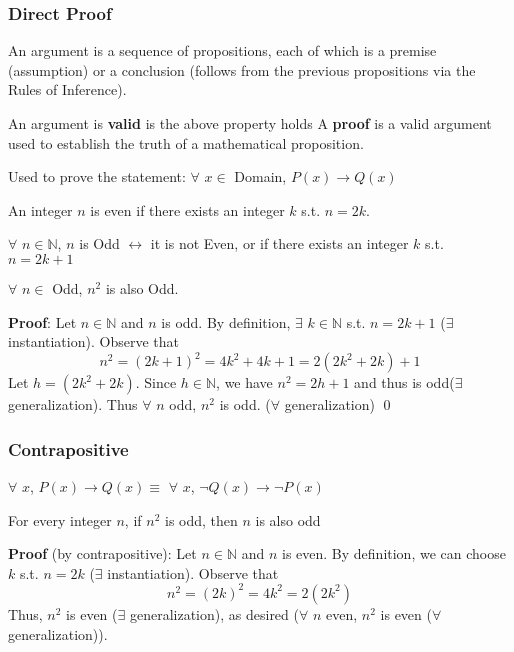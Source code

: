\documentclass[11pt]{scrartcl}
\begin{document}
\subsubsection{Direct Proof}
\begin{definition}[Argument]
    An argument is a sequence of propositions, each of which is a premise (assumption) or a conclusion (follows from the previous propositions via the Rules of Inference). 
\end{definition}
An argument is \textbf{valid} is the above property holds
A \textbf{proof} is a valid argument used to establish the truth of a mathematical proposition.
\begin{definition}
    Used to prove the statement: $\forall$ $x \in$ Domain, $P(x) \rightarrow Q(x)$
\end{definition}
\begin{example}
    \begin{definition}[Even]
        An integer $n$ is even if there exists an integer $k$ s.t. $n=2k$.
    \end{definition}
    \begin{definition}[Odd]
        $\forall$ $n \in \mathbb{N}$, $n$ is Odd $\leftrightarrow$ it is not Even, or if there exists an integer $k$ s.t. $n=2k+1$
    \end{definition}
    \noindent
    \begin{proposition}[A]
    $\forall$ $n \in$ Odd, $n^2$ is also Odd.\\
    \end{proposition}
    \textbf{Proof}: Let $n\in \mathbb{N}$ and $n$ is odd. By definition, $\exists$ $k \in \mathbb{N}$ s.t. $n=2k+1$ ($\exists$ instantiation). Observe that $$n^2 = (2k+1)^2 = 4k^2 + 4k + 1 = 2(2k^2 + 2k) + 1$$  Let $h =(2k^2 + 2k)$. Since $h \in \mathbb{N}$, we have $n^2 = 2h+1$ and thus is odd($\exists$ generalization).  Thus $\forall$ $n$ odd, $n^2$ is odd. ($\forall$ generalization) \qed
\end{example}
\subsubsection{Contrapositive}
\begin{definition}[Contrapositive]
    $\forall $ $x$, $P(x) \rightarrow Q(x) \equiv$ $\forall$ $x$, $\neg Q(x) \rightarrow \neg P(x)$
\end{definition}
\begin{example}
    \begin{proposition}[B] For every integer $n$, if $n^2$ is odd, then $n$ is also odd
    \end{proposition}
    \textbf{Proof} (by contrapositive): Let $n \in \mathbb{N}$ and $n$ is even. By definition, we can choose $k$ s.t. $n=2k$ ($\exists$ instantiation).  Observe that $$n^2 = (2k)^2 = 4k^2 = 2(2k^2)$$  Thus, $n^2$ is even ($\exists$ generalization), as desired ($\forall$ $n$ even, $n^2$ is even ($\forall$ generalization)).
\end{example}
\end{document}
